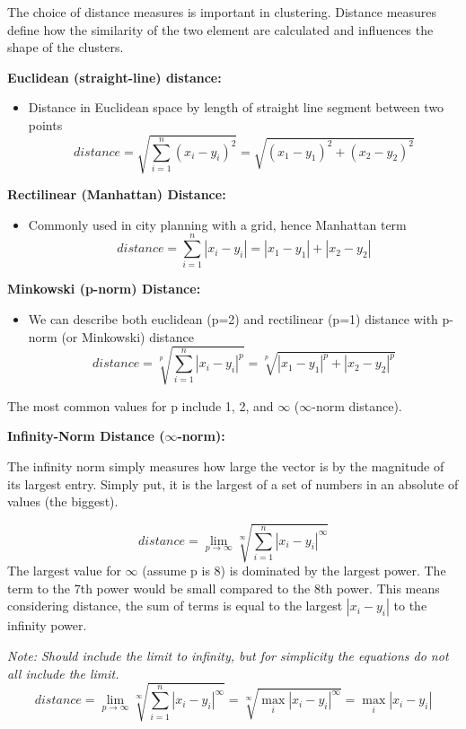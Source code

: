 \documentclass[
]{book}
\providecommand{\tightlist}{%
  \setlength{\itemsep}{0pt}\setlength{\parskip}{0pt}}
\begin{document}
The choice of distance measures is important in clustering.
Distance measures define how the similarity of the two element are calculated and influences the shape of the clusters.

\textbf{Euclidean (straight-line) distance:}

\begin{itemize}
\tightlist
\item
  Distance in Euclidean space by length of straight line segment between two points
  \[
  distance = \sqrt{\sum^n_{i=1}(x_i - y_i)^2} = \sqrt{(x_1-y_1)^2+(x_2-y_2)^2}
  \]
\end{itemize}

\textbf{Rectilinear (Manhattan) Distance:}

\begin{itemize}
\tightlist
\item
  Commonly used in city planning with a grid, hence Manhattan term
  \[
  distance = \sum^n_{i=1} |x_i-y_i| =  |x_1-y_1| + |x_2-y_2|
  \]
\end{itemize}

\textbf{Minkowski (p-norm) Distance:}

\begin{itemize}
\tightlist
\item
  We can describe both euclidean (p=2) and rectilinear (p=1) distance with p-norm (or Minkowski) distance
  \[
  distance = \sqrt[p]{\sum^n_{i=1} |x_i-y_i|^p} = \sqrt[p]{|x_1-y_1|^p + |x_2-y_2|^p}
  \]
\end{itemize}

The most common values for p include 1, 2, and \(\infty\) (\(\infty\)-norm distance).

\textbf{Infinity-Norm Distance (\(\infty\)-norm):}

The infinity norm simply measures how large the vector is by the magnitude of its largest entry.
Simply put, it is the largest of a set of numbers in an absolute of values (the biggest).

\[
distance = \lim_{p\to\infty} \sqrt[\infty]{\sum^n_{i=1} |x_i-y_i|^{\infty}} 
\]
The largest value for \(\infty\) (assume p is 8) is dominated by the largest power.
The term to the 7th power would be small compared to the 8th power.
This means considering distance, the sum of terms is equal to the largest \(|x_i-y_i|\) to the infinity power.

\emph{Note: Should include the limit to infinity, but for simplicity the equations do not all include the limit.}
\[
distance = \lim_{p\to\infty} \sqrt[\infty]{\sum^n_{i=1} |x_i-y_i|^{\infty}} = \sqrt[\infty]{\max_i |x_i-y_i|^{\infty}}=\max_i |x_i-y_i|
\]
\end{document}
